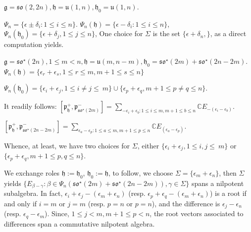 \documentclass[12pt]{amsart}
\theoremstyle{definition}
\theoremstyle{remark}
\newcommand{\g}{\mathfrak{g}}
\newcommand{\h}{\mathfrak{h}}
\renewcommand{\k}{{\mathfrak k}}
\renewcommand{\l}{\mathfrak l}
\newcommand{\p}{\mathfrak p}
\newcommand{\q}{\mathfrak q}
\newcommand{\C}{{\mathbb C}}
\numberwithin{equation}{section}
\begin{document}
\smallskip

$\g=\mathfrak{so}(2,2n),   \h=\mathfrak{u}(1,n) , \h_0=\mathfrak{u}(1,n) $.

  $\Psi_n=\{\epsilon \pm \delta_i :  1 \leq i \leq n \}$. $\Psi_n(\h)=\{ \epsilon - \delta_i  :  1 \leq i\leq n \}$, $\Psi_n(\h_0)=\{ \epsilon + \delta_j,  1 \leq j \leq n  \}$, %
   One  choice  for $\Sigma$ is the set
$  \{ \epsilon +\delta_n,   \}$,   as a direct computation yields.

$\g=\mathfrak{so}^\star(2n), 1\leq m <n,  \h=\mathfrak u(m,n-m), \h_0=\mathfrak{so}^\star(2m)+\mathfrak{so}^\star(2n-2m)$.
$\Psi_n(\h)=\{ \epsilon_r +\epsilon_s, 1\leq r \leq m, m+1 \leq s \leq n \}$

$\Psi_n(\h_0)=\{ \epsilon_i +\epsilon_j, 1\leq i \not= j \leq \ m  \}\cup \{ \epsilon_p +\epsilon_q, m+1\leq p \not= q \leq  n  \} $.

It readily follows: $[\p_\h^+, \p_{\mathfrak{so}^\star(2m)}^-]=\sum_{-\epsilon_i+\epsilon_b: 1\leq i\leq m, m+1\leq b \leq n} \C E_{-(\epsilon_i -\epsilon_b)}$.

 $[\p_\h^+, \p_{\mathfrak{so}^\star(2n-2m)}^-]=\sum_{\epsilon_a-\epsilon_p: 1\leq a\leq m, m+1\leq p\leq n} \C E_{(\epsilon_a -\epsilon_p)}$.


Whence, at least, we have two choices for $\Sigma$, either $\{ \epsilon_i +\epsilon_j, 1\leq i,j \leq \ m  \}$ or $\{ \epsilon_p +\epsilon_q, m+1\leq p,q \leq  n  \}$.


We exchange roles $\h:=\h_0$, $\h_0:=\h$, to follow, we    choose $\Sigma=\{\epsilon_m +\epsilon_n\}$, then $\Sigma$  yields   $\{E_{\beta - \gamma}: \beta \in \Psi_n(\mathfrak{so}^\star(2m)+\mathfrak{so}^\star(2n-2m)), \gamma \in \Sigma \}$ spans a nilpotent subalgebra.  In fact,    $\epsilon_i +\epsilon_j-(\epsilon_m +\epsilon_n)$ (resp. $ \epsilon_p +\epsilon_q-(\epsilon_m +\epsilon_n)$) is a root if and only if $i=m $ or $j=m$ (resp. $p=n $ or $p=n$), and the difference is $\epsilon_j-\epsilon_n$ (resp. $\epsilon_q-\epsilon_m$). Since, $1\leq j <m, m+1 \leq p <n$, the   root vectors associated  to differences span a commutative nilpotent algebra.
\end{document}
